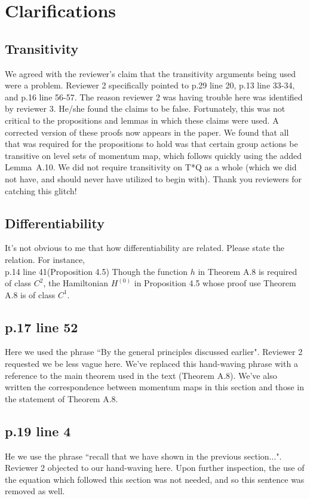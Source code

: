 \documentclass{article}
\begin{document}
\section{Clarifications}

\subsection{Transitivity}
We agreed with the reviewer's claim that the transitivity arguments being used were a problem.  Reviewer 2 specifically pointed to p.29 line 20, p.13 line 33-34, and
p.16 line 56-57.
The reason reviewer 2 was having trouble here was identified by reviewer 3.  He/she found the claims to be false.  Fortunately, this was not critical to the propositions and lemmas in which these claims were used.  A corrected version of these proofs now appears in the paper.  We found that all that was required for the propositions to hold was that certain group actions be transitive on level sets of momentum map, which follows quickly using the added Lemma~A.10. We did not require transitivity on T*Q as a whole (which we did not have, and should never have utilized to begin with). Thank you reviewers for catching this glitch!

\subsection{Differentiability}
It's not obvious to me that how differentiability are related. Please state the relation. 
For instance, 
\\
p.14 line 41(Proposition 4.5) Though the function $h$ in Theorem A.8 is required of class $C^2$, 
the Hamiltonian $H^{(0)}$ in Proposition 4.5 whose proof use Theorem A.8 is of class $C^1$.  



\subsection{p.17 line 52}
 Here we used the phrase ``By the general principles discussed earlier".
 Reviewer 2 requested we be less vague here.  We've replaced this hand-waving phrase with a reference to the main theorem used in the text (Theorem A.8).  We've also written the correspondence between momentum maps in this section and those in the statement of Theorem A.8.

\subsection{p.19 line 4}
He we use the phrase ``recall that we have shown in the previous section...". 
Reviewer 2 objected to our hand-waving here.
Upon further inspection, the use of the equation which followed this section was not needed, and so this sentence was removed as well.
\end{document}
